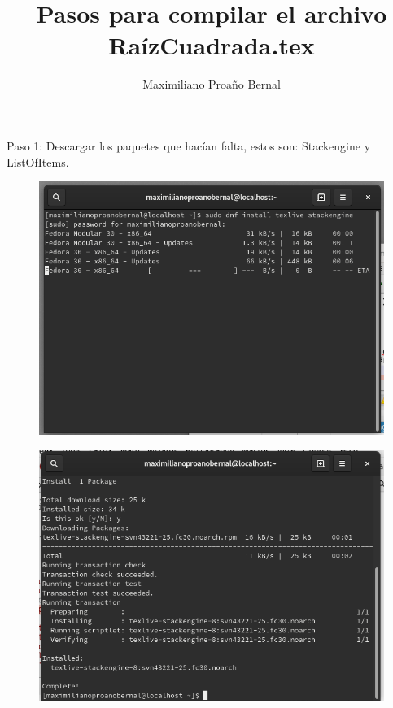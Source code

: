 \documentclass[]{article}
\title{Pasos para compilar el archivo RaízCuadrada.tex}
\author{Maximiliano Proaño Bernal}
\begin{document}
\maketitle
Paso 1: Descargar los paquetes que hacían falta, estos son: Stackengine y ListOfItems.
\begin{figure}[H]
	\centering
	\includegraphics[width=0.5\linewidth]{"Imagenes/Captura 1 Raiz"}
	\caption{}
	\label{fig:captura-1-raiz}
\end{figure}
\begin{figure}[H]
	\centering
	\includegraphics[width=0.5\linewidth]{"Imagenes/Captura 2 Raiz"}
	\caption{}
	\label{fig:captura-2-raiz}
\end{figure}
\end{document}
